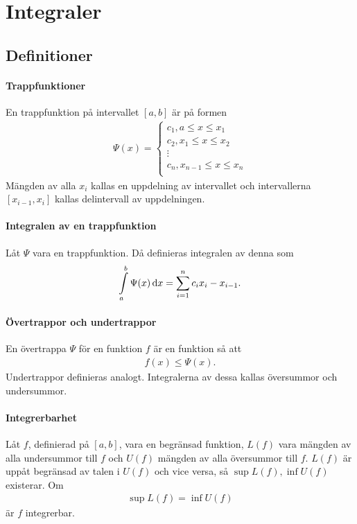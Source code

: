 \section{Integraler}

\subsection{Definitioner}

\paragraph{Trappfunktioner}
En trappfunktion på intervallet $[a, b]$ är på formen
\begin{align*}
	\Psi(x) =
	\begin{cases}
		c_1, a\leq x\leq x_1 \\
		c_2, x_1\leq x\leq x_2 \\
		\vdots \\
		c_n, x_{n - 1}\leq x\leq x_n \\
	\end{cases}
\end{align*}
Mängden av alla $x_i$ kallas en uppdelning av intervallet och intervallerna $[x_{i - 1}, x_i]$ kallas delintervall av uppdelningen.

\paragraph{Integralen av en trappfunktion}
Låt $\Psi$ vara en trappfunktion. Då definieras integralen av denna som
\begin{align*}
	\int\limits_{a}^{b}\Psi(x)\dd{x} = \sum\limits_{i = 1}^{n}c_i{x_i - x_{i - 1}}.
\end{align*}

\paragraph{Övertrappor och undertrappor}
En övertrappa $\Psi$ för en funktion $f$ är en funktion så att
\begin{align*}
	f(x)\leq \Psi(x).
\end{align*}
Undertrappor definieras analogt. Integralerna av dessa kallas översummor och undersummor.

\paragraph{Integrerbarhet}
Låt $f$, definierad på $[a, b]$, vara en begränsad funktion, $L(f)$ vara mängden av alla undersummor till $f$ och $U(f)$ mängden av alla översummor till $f$. $L(f)$ är uppåt begränsad av talen i $U(f)$ och vice versa, så $\sup{L(f)}, \inf{U(f)}$ existerar. Om
\begin{align*}
	\sup{L(f)} = \inf{U(f)}
\end{align*}
är $f$ integrerbar.

